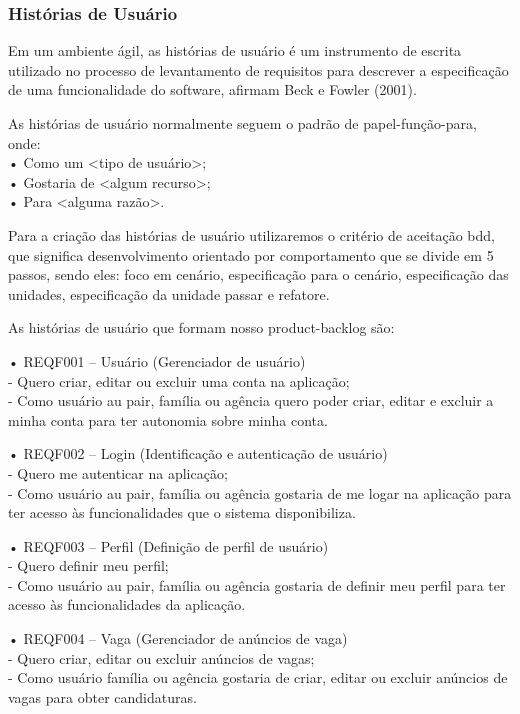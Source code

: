 \subsubsection{Histórias de Usuário}

Em um ambiente ágil, as \ac{histórias de usuário} é um instrumento de escrita utilizado no processo de levantamento de requisitos para descrever a especificação de uma funcionalidade do software, afirmam Beck e Fowler (2001). 

As \ac{histórias de usuário} normalmente seguem o padrão de papel-função-para, onde:\\
•	Como um <tipo de usuário>;\\
•	Gostaria de <algum recurso>;\\
•	Para <alguma razão>.

Para a criação das histórias de usuário utilizaremos o critério de aceitação \ac{bdd}, que significa desenvolvimento orientado por comportamento que se divide em 5 passos, sendo eles: foco em cenário, especificação para o cenário, especificação das unidades, especificação da unidade passar e refatore. 

As \ac{histórias de usuário} que formam nosso \ac{product-backlog} são:

• REQF001 – Usuário (Gerenciador de usuário)
\\ - Quero criar, editar ou excluir uma conta na aplicação;
\\ - Como usuário au pair, família ou agência quero poder criar, editar e excluir a minha conta para ter autonomia sobre minha conta.

• REQF002 – Login (Identificação e autenticação de usuário)
\\ - Quero me autenticar na aplicação;
\\ - Como usuário au pair, família ou agência gostaria de me logar na aplicação para ter acesso às funcionalidades que o sistema disponibiliza.

• REQF003 – Perfil (Definição de perfil de usuário)
\\ - Quero definir meu perfil; 
\\ - Como usuário au pair, família ou agência gostaria de definir meu perfil para ter acesso às funcionalidades da aplicação. 

• REQF004 – Vaga (Gerenciador de anúncios de vaga)
\\ - Quero criar, editar ou excluir anúncios de vagas;
\\ - Como usuário família ou agência gostaria de criar, editar ou excluir anúncios de vagas para obter candidaturas. 

